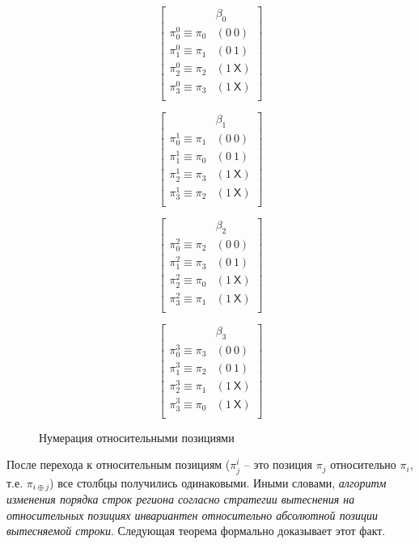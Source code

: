 \begin{enumerate}
\begin{figure}[h]
\parbox{0.24\textwidth}{
$$ \left[
  \begin{array}{c|c}
          & \beta_0 \\ \hline
    \pi^0_0 \equiv \pi_0 & (0~0) \\
    \pi^0_1 \equiv \pi_1 & (0~1) \\
    \pi^0_2 \equiv \pi_2 & (1~\textsf{X}) \\
    \pi^0_3 \equiv \pi_3 & (1~\textsf{X}) \\
  \end{array}
\right]
$$
}\parbox{0.24\textwidth}{
$$ \left[
  \begin{array}{c|c}
          & \beta_1 \\ \hline
    \pi^1_0 \equiv \pi_1 & (0~0) \\
    \pi^1_1 \equiv \pi_0 & (0~1) \\
    \pi^1_2 \equiv \pi_3 & (1~\textsf{X}) \\
    \pi^1_3 \equiv \pi_2 & (1~\textsf{X}) \\
  \end{array}
\right]
$$
}\parbox{0.24\textwidth}{
$$ \left[
  \begin{array}{c|c}
          & \beta_2 \\ \hline
    \pi^2_0 \equiv \pi_2 & (0~0) \\
    \pi^2_1 \equiv \pi_3 & (0~1) \\
    \pi^2_2 \equiv \pi_0 & (1~\textsf{X}) \\
    \pi^2_3 \equiv \pi_1 & (1~\textsf{X}) \\
  \end{array}
\right]
$$
}\parbox{0.24\textwidth}{
$$ \left[
  \begin{array}{c|c}
          & \beta_3 \\ \hline
    \pi^3_0 \equiv \pi_3 & (0~0) \\
    \pi^3_1 \equiv \pi_2 & (0~1) \\
    \pi^3_2 \equiv \pi_1 & (1~\textsf{X}) \\
    \pi^3_3 \equiv \pi_0 & (1~\textsf{X}) \\
  \end{array}
\right]
$$
}
\caption{Нумерация относительными позициями}\label{fig:plru_def_step2}
\end{figure}

После перехода к относительным позициям ($\pi^i_j$ -- это позиция
$\pi_j$ относительно $\pi_i$, т.е. $\pi_{i \oplus j}$) все столбцы получились одинаковыми.
Иными словами, \emph{алгоритм изменения порядка строк региона согласно стратегии
вытеснения \PseudoLRU на относительных позициях инвариантен
относительно абсолютной позиции вытесняемой строки}. Следующая теорема
формально доказывает этот факт.


\end{enumerate}
